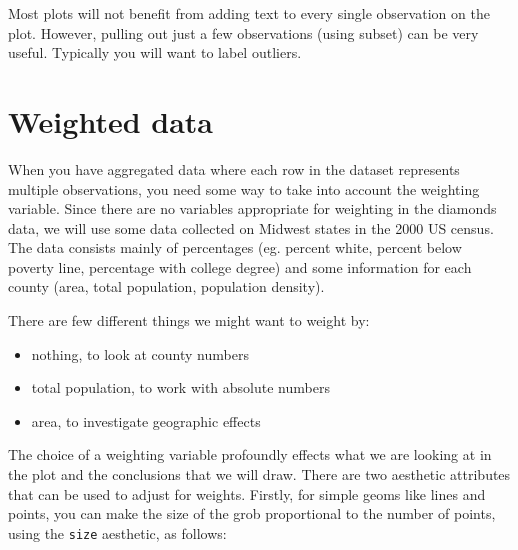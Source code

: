 Most plots will not benefit from adding text to every single observation on the plot.  However, pulling out just a few observations (using subset) can be very useful.  Typically you will want to label outliers.



\section{Weighted data}
\label{sec:weighting}


When you have aggregated data where each row in the dataset represents multiple observations, you need some way to take into account the weighting variable.  Since there are no variables appropriate for weighting in the diamonds data, we will use some data collected on Midwest states in the 2000 US census.  The data consists mainly of percentages (eg. percent white, percent below poverty line, percentage with college degree) and some information for each county (area, total population, population density).

There are few different things we might want to weight by: 

\begin{itemize}
	\item nothing, to look at county numbers
	\item total population, to work with absolute numbers
	\item area, to investigate geographic effects
\end{itemize}

\noindent The choice of a weighting variable profoundly effects what we are looking at in the plot and the conclusions that we will draw.  There are two aesthetic attributes that can be used to adjust for weights.  Firstly, for simple geoms like lines and points, you can make the size of the grob proportional to the number of points, using the {\tt size} aesthetic, as follows:

%


